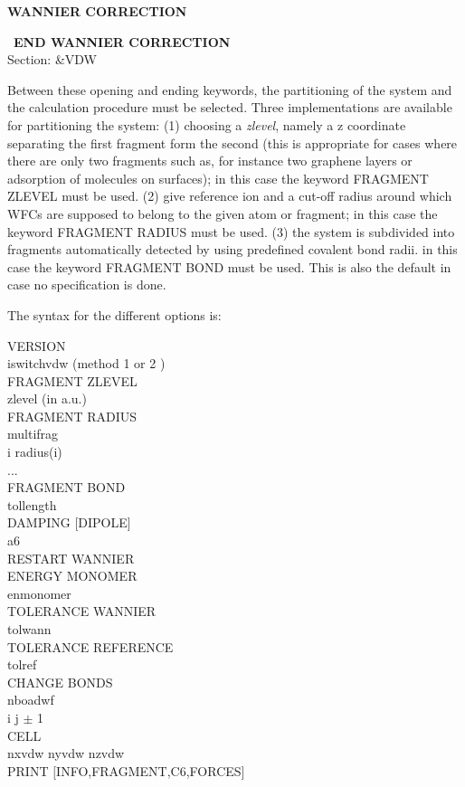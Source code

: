 \documentclass[twoside,10pt,titlepage,a4paper]{article}
\newcommand{\reflabel}[1]{\hypertarget{#1}}
\newcommand{\reflabel}[1]{\label{#1}}
\newcommand{\keyword}[5]{%
\vspace{1.0cm}
\begin{minipage}{15cm}
\reflabel{#1}{\textbf{\large #1}}%
\index{#1}%
\ \textbf{#2}%
\ \textbf{#3}%
\ \textit{#4}%
     \hfill\\\smallskip
     {Section: #5}
     \hfill\\\smallskip\vskip 10pt
\end{minipage}
}%
\newcommand{\desc}[1]{%
   \hspace*{\fill} \parbox{130mm}{\sloppy
                          {#1}%
                             }
     \hfill\\\smallskip
   }%
\newcommand{\desc}[1]{#1\vspace{1ex}}
\begin{document}
\keyword{WANNIER CORRECTION}{END WANNIER CORRECTION}{}{}{\&VDW}
\desc{Between these opening and ending keywords, the partitioning of the system
 and the calculation procedure must be selected. Three implementations are available
 for partitioning the system: 
 (1) choosing a {\it zlevel}, namely a z coordinate separating
  the first fragment form the second (this is appropriate for cases where
  there are only two fragments such as, for instance two graphene layers or
  adsorption of molecules on surfaces); in this case the keyword FRAGMENT ZLEVEL
  must be used. 
 (2) give reference ion and a cut-off radius around which WFCs  are supposed to 
  belong to the given atom or fragment; in this case the keyword FRAGMENT RADIUS
  must be used.
 (3) the system is subdivided into fragments automatically detected by using 
  predefined covalent bond radii. in this case the keyword FRAGMENT BOND
  must be used. This is also the default in case no specification is done.
 
  The syntax for the different options is:

    VERSION \\
     iswitchvdw (method 1 \cite{psil1} or 2 \cite{psil2}) \\
    FRAGMENT ZLEVEL \\
     zlevel (in a.u.) \\
   FRAGMENT RADIUS \\
     multifrag \\
     i radius(i) \\
     ... \\
   FRAGMENT BOND \\
     tollength  \\
   DAMPING [DIPOLE] \\
     a6 \\
   RESTART WANNIER \\
   ENERGY MONOMER \\
     enmonomer \\
   TOLERANCE WANNIER \\
     tolwann  \\
   TOLERANCE REFERENCE \\
     tolref \\
   CHANGE BONDS \\
    nboadwf \\
    i  j $\pm$ 1  \\
   CELL \\
    nxvdw nyvdw nzvdw \\
   PRINT $[$INFO,FRAGMENT,C6,FORCES$]$

}
\end{document}
